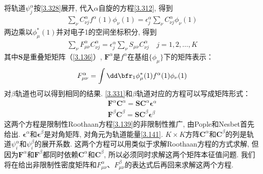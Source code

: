 将轨道$\psi^\alpha_j$按\autoref{3.328}展开, 代入$\alpha$自旋的\hft 方程\autoref{3.312}, 得到
\begin{align}
	\sum_\nu C^\alpha_{\nu j}f^\alpha(1)\phi_\nu(1)=\epsilon^\alpha_j\sum_\nu C^\alpha_{\nu j}\phi_\nu(1)
\end{align}
两边乘以$\phi_\mu^*(1)$并对电子1的空间坐标积分, 得到
\begin{align}\label{3.331}
	\sum_\nu F^\alpha_{\mu\nu}C^\alpha_{\nu j} = \epsilon^\alpha_j\sum_\nu S_{\mu\nu}C^\alpha_{\nu j} \quad j=1,2,\ldots,K
\end{align}
其中$\mathbf{S}$是重叠矩矩阵（\autoref{3.136}）, $\mathbf{F}^\alpha$是$f^\alpha$在基组$\{\phi_\mu\}$下的矩阵表示：
\begin{align}
	F^\alpha_{\mu\nu}=\int{\dd\bfr_1}\phi^*_\mu(1)f^\alpha(1)\phi_\nu(1)
\end{align}
对$\beta$轨道也可以得到相同的结果. \autoref{3.331}和$\beta$轨道对应的方程可以写成矩阵形式：
\begin{align}
	\mathbf{F}^\alpha\mathbf{C}^\alpha = \mathbf{S}\mathbf{C}^\alpha\bm{\epsilon}^\alpha\\
	\mathbf{F}^\beta\mathbf{C}^\beta = \mathbf{S}\mathbf{C}^\beta\bm{\epsilon}^\beta
\end{align}
这两个方程是限制性Roothaan方程\autoref{3.139}的非限制性推广, 由Pople和Nesbet首先给出. 
$\bm{\epsilon}^\alpha$和$\bm{\epsilon}^\beta$是对角矩阵, 对角元为轨道能量\autoref{3.141}. 
$K\times K$方阵$\mathbf{C}^\alpha$和$\mathbf{C}^\beta$的列是轨道$\psi_i^\alpha$和$\psi_i^\beta$的展开系数. 
这两个方程可以用类似于求解Roothaan方程的方式求解, 但因为$\mathbf{F}^\alpha$和$\mathbf{F}^\beta$都同时依赖$\mathbf{C}^\alpha$和$\mathbf{C}^\beta$, 
所以必须同时求解这两个矩阵本征值问题. 我们将在给出非限制性密度矩阵和$F^\alpha_{\mu\nu}$、$F^\beta_{\mu\nu}$的表达式后再回来求解这两个方程. 
